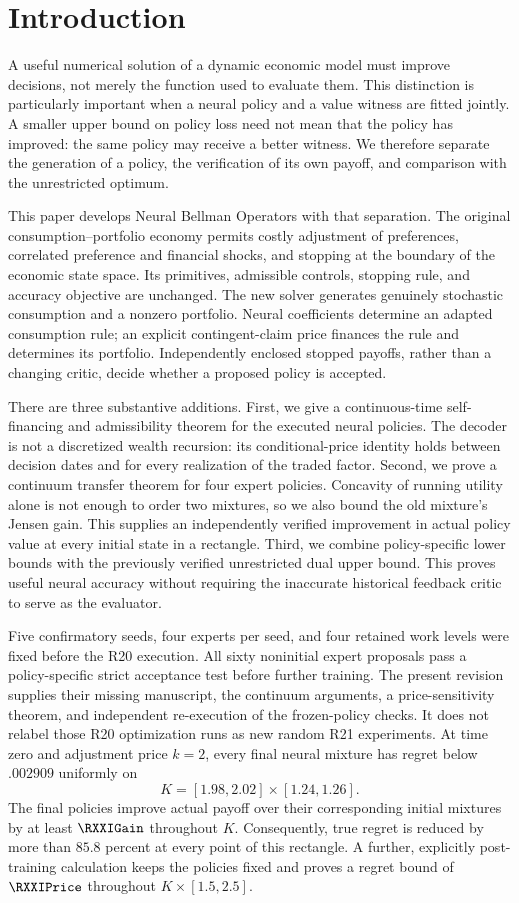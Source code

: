 \section{Introduction}\label{sec:r21intro}
A useful numerical solution of a dynamic economic model must improve decisions, not merely the function used to evaluate them. This distinction is particularly important when a neural policy and a value witness are fitted jointly. A smaller upper bound on policy loss need not mean that the policy has improved: the same policy may receive a better witness. We therefore separate the generation of a policy, the verification of its own payoff, and comparison with the unrestricted optimum.

This paper develops Neural Bellman Operators with that separation. The original consumption--portfolio economy permits costly adjustment of preferences, correlated preference and financial shocks, and stopping at the boundary of the economic state space. Its primitives, admissible controls, stopping rule, and accuracy objective are unchanged. The new solver generates genuinely stochastic consumption and a nonzero portfolio. Neural coefficients determine an adapted consumption rule; an explicit contingent-claim price finances the rule and determines its portfolio. Independently enclosed stopped payoffs, rather than a changing critic, decide whether a proposed policy is accepted.

There are three substantive additions. First, we give a continuous-time self-financing and admissibility theorem for the executed neural policies. The decoder is not a discretized wealth recursion: its conditional-price identity holds between decision dates and for every realization of the traded factor. Second, we prove a continuum transfer theorem for four expert policies. Concavity of running utility alone is not enough to order two mixtures, so we also bound the old mixture's Jensen gain. This supplies an independently verified improvement in actual policy value at every initial state in a rectangle. Third, we combine policy-specific lower bounds with the previously verified unrestricted dual upper bound. This proves useful neural accuracy without requiring the inaccurate historical feedback critic to serve as the evaluator.

Five confirmatory seeds, four experts per seed, and four retained work levels were fixed before the R20 execution. All sixty noninitial expert proposals pass a policy-specific strict acceptance test before further training. The present revision supplies their missing manuscript, the continuum arguments, a price-sensitivity theorem, and independent re-execution of the frozen-policy checks. It does not relabel those R20 optimization runs as new random R21 experiments. At time zero and adjustment price $k=2$, every final neural mixture has regret below $.002909$ uniformly on
\[
 K=[1.98,2.02]\times[1.24,1.26].
\]
The final policies improve actual payoff over their corresponding initial mixtures by at least $\RXXIGain$ throughout $K$. Consequently, true regret is reduced by more than $85.8$ percent at every point of this rectangle. A further, explicitly post-training calculation keeps the policies fixed and proves a regret bound of $\RXXIPrice$ throughout $K\times[1.5,2.5]$.

